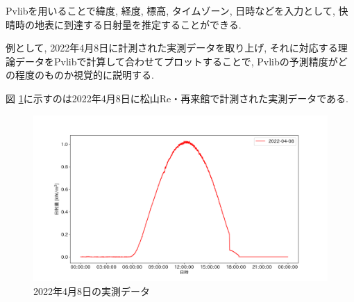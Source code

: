 \documentclass[a4j,12pt,]{jarticle}
\begin{document}
Pvlibを用いることで緯度, 経度, 標高, タイムゾーン, 日時などを入力として, 快晴時の地表に到達する日射量を推定することができる. 

例として, 2022年4月8日に計測された実測データを取り上げ, それに対応する理論データをPvlibで計算して合わせてプロットすることで, Pvlibの予測精度がどの程度のものか視覚的に説明する. 




図 \ref{p2}に示すのは2022年4月8日に松山Re・再来館で計測された実測データである. 

\begin{figure}[H]
  \begin{center}
    \includegraphics[width=160mm]{real.png}
    \caption{2022年4月8日の実測データ}
    \label{p2}
  \end{center}
\end{figure}
\end{document}
